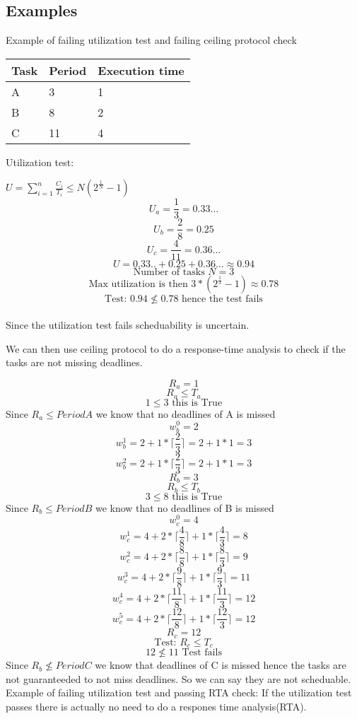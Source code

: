 \subsection{Examples}
Example of failing utilization test and failing ceiling protocol check

\begin{center}
    \begin{tabular}{ | l | l | l |}
    \hline
    Task & Period & Execution time \\ \hline
    A & 3  & 1 \\ \hline
    B & 8 & 2 \\ \hline
    C & 11 & 4 \\ \hline
    \end{tabular}
\end{center}

Utilization test:

$ U = \sum\limits_{i=1}^n \frac{C_i}{T_i} \leq N(2^{\frac{1}{N}} - 1) $
$$ U_a =  \frac{1}{3} = 0.33... $$
$$ U_b =  \frac{2}{8} = 0.25 $$
$$ U_c =  \frac{4}{11} = 0.36... $$
$$ U = 0.33.. + 0.25 + 0.36... 	\approx 0.94 $$
$$ \text{Number of tasks } N = 3 $$
$$ \text{Max utilization is then } 3*(2^{\frac{1}{3}} - 1) \approx 0.78 $$
$$ \text{Test: } 0.94 \nleq 0.78 \text{ hence the test fails} $$\\

Since the utilization test fails scheduability is uncertain.\newline

We can then use ceiling protocol to do a response-time analysis to check if the tasks are not missing deadlines.

$$ R_a = 1 $$
$$ R_a \leq T_a $$
$$1 \leq 3 \text { this is True} $$
Since $R_a \leq Period A $ we know that no deadlines of A is missed
$$ w_b^0 = 2  $$
$$ w_b^1 = 2 +  1 * \lceil \frac{2}{3} \rceil = 2 + 1*1 = 3 $$
$$ w_b^2 = 2 +  1 * \lceil \frac{2}{3} \rceil = 2 + 1*1 = 3 $$
$$ R_b = 3 $$
$$ R_b \leq T_b $$ 
$$ 3 \leq 8 \text { this is True} $$
Since $R_b \leq Period B $ we know that no deadlines of B is missed
$$ w_c^0 = 4  $$
$$ w_c^1 = 4 + 2 * \lceil \frac{4}{8} \rceil + 1 * \lceil \frac{4}{3} \rceil = 8 $$
$$ w_c^2 = 4 + 2 * \lceil \frac{8}{8} \rceil + 1 * \lceil \frac{8}{3} \rceil = 9 $$
$$ w_c^3 = 4 + 2 * \lceil \frac{9}{8} \rceil + 1 * \lceil \frac{9}{3} \rceil  = 11 $$
$$ w_c^4 = 4 + 2 * \lceil \frac{11}{8} \rceil + 1 * \lceil \frac{11}{3} \rceil = 12 $$
$$ w_c^5 = 4 + 2 * \lceil \frac{12}{8} \rceil + 1 * \lceil \frac{12}{3} \rceil  = 12 $$
$$ R_c = 12 $$
$$\text{Test: } R_c \leq T_c $$
$$ 12 \nleq 11 \text{ Test fails}$$
Since $R_b \nleq Period  C $ we know that deadlines of C is missed hence the tasks are not guaranteeded to not miss deadlines. So we can say they are not scheduable. 
\newline
\newline
Example of failing utilization test and passing RTA check:
\newline
If the utilization test passes there is actually no need to do a respones time analysis(RTA).

